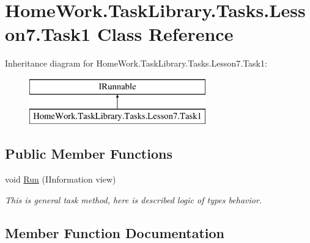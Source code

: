 \hypertarget{class_home_work_1_1_task_library_1_1_tasks_1_1_lesson7_1_1_task1}{}\section{Home\+Work.\+Task\+Library.\+Tasks.\+Lesson7.\+Task1 Class Reference}
\label{class_home_work_1_1_task_library_1_1_tasks_1_1_lesson7_1_1_task1}
Inheritance diagram for Home\+Work.\+Task\+Library.\+Tasks.\+Lesson7.\+Task1\+:\begin{figure}[H]
\begin{center}
\leavevmode
\includegraphics[height=2.000000cm]{class_home_work_1_1_task_library_1_1_tasks_1_1_lesson7_1_1_task1}
\end{center}
\end{figure}
\subsection*{Public Member Functions}
\begin{DoxyCompactItemize}
\item 
void \mbox{\hyperlink{class_home_work_1_1_task_library_1_1_tasks_1_1_lesson7_1_1_task1_a0447ec267a65943d7e51cfb6b09cd0aa}{Run}} (I\+Information view)
\begin{DoxyCompactList}\small\item\em This is general task method, here is described logic of types behavior. \end{DoxyCompactList}\end{DoxyCompactItemize}


\subsection{Member Function Documentation}
\mbox{\label{class_home_work_1_1_task_library_1_1_tasks_1_1_lesson7_1_1_task1_a0447ec267a65943d7e51cfb6b09cd0aa}} 
